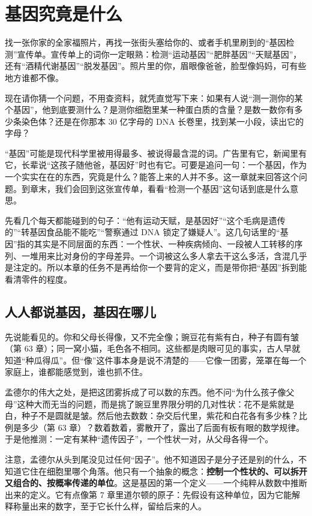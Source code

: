 \chapter{基因究竟是什么}

\begin{kaichang}
找一张你家的全家福照片，再找一张街头塞给你的、或者手机里刷到的“基因检测”宣传单。宣传单上的词你一定眼熟：检测“运动基因”“肥胖基因”“天赋基因”，还有“酒精代谢基因”“脱发基因”。照片里的你，眉眼像爸爸，脸型像妈妈，可有些地方谁都不像。

现在请你猜一个问题，不用查资料，就凭直觉写下来：如果有人说“测一测你的某个基因”，他到底要测什么？是测你细胞里某一种蛋白质的含量？是数一数你有多少条染色体？还是在你那本 30 亿字母的 DNA 长卷里，找到某一小段，读出它的字母？

“基因”可能是现代科学里被用得最多、被说得最含混的词。广告里有它，新闻里有它，长辈说“这孩子随他爸，基因好”时也有它。可要是追问一句：一个基因，作为一个实实在在的东西，究竟是什么？能答上来的人并不多。这一章就来回答这个问题。到章末，我们会回到这张宣传单，看看“检测一个基因”这句话到底是什么意思。

先看几个每天都能碰到的句子：“他有运动天赋，是基因好”“这个毛病是遗传的”“转基因食品能不能吃”“警察通过 DNA 锁定了嫌疑人”。这几句话里的“基因”指的其实是不同层面的东西：一个性状、一种疾病倾向、一段被人工转移的序列、一堆用来比对身份的字母差异。一个词被这么多人拿去干这么多活，含混几乎是注定的。所以本章的任务不是再给你一个要背的定义，而是带你把“基因”拆到能看清零件的程度。
\end{kaichang}

\section{人人都说基因，基因在哪儿}

先说能看见的。你和父母长得像，又不完全像；豌豆花有紫有白，种子有圆有皱（第 63 章）；同一窝小猫，毛色各不相同。这些都是肉眼可见的事实，古人早就知道“种瓜得瓜”。但“像”这件事本身是说不清楚的——它像一团雾，笼罩在每一个家庭上，谁都能感觉到，谁也抓不住。

孟德尔的伟大之处，是把这团雾拆成了可以数的东西。他不问“为什么孩子像父母”这种大而无当的问题，而是挑了豌豆里界限分明的几对性状：花不是紫就是白，种子不是圆就是皱。然后他去数数：杂交后代里，紫花和白花各有多少株？比例是多少（第 63 章）？数着数着，雾散开了，露出了后面有板有眼的数学规律。于是他推测：一定有某种“遗传因子”，一个性状一对，从父母各得一个。

注意，孟德尔从头到尾没见过任何“因子”。他不知道因子是分子还是别的什么，不知道它住在细胞里哪个角落。他只有一个抽象的概念：\textbf{控制一个性状的、可以拆开又组合的、按概率传递的单位}。这是基因的第一个定义——一个纯粹从数数中推断出来的定义。它有点像第 7 章里道尔顿的原子：先假设有这种单位，因为它能解释称量出来的数字，至于它长什么样，留给后来的人。

